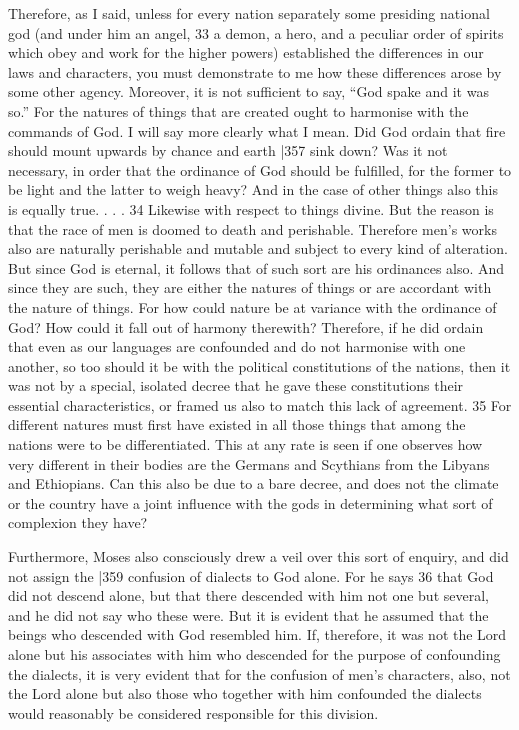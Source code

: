 Therefore, as I said, unless for every nation separately some presiding national god (and under him an angel, 33 a demon, a hero, and a peculiar order of spirits which obey and work for the higher powers) established the differences in our laws and characters, you must demonstrate to me how these differences arose by some other agency. Moreover, it is not sufficient to say, ``God spake and it was so.'' For the natures of things that are created ought to harmonise with the commands of God. I will say more clearly what I mean. Did God ordain that fire should mount upwards by chance and earth
|357 sink down? Was it not necessary, in order that the ordinance of God should be fulfilled, for the former to be light and the latter to weigh heavy? And in the case of other things also this is equally true. . . .
34 Likewise with respect to things divine. But the reason is that the race of men is doomed to death and perishable. Therefore men's works also are naturally perishable and mutable and subject to every kind of alteration. But since God is eternal, it follows that of such sort are his ordinances also. And since they are such, they are either the natures of things or are accordant with the nature of things. For how could nature be at variance with the ordinance of God? How could it fall out of harmony therewith? Therefore, if he did ordain that even as our languages are confounded and do not harmonise with one another, so too should it be with the political constitutions of the nations, then it was not by a special, isolated decree that he gave these
constitutions their essential characteristics, or framed us also to match this lack of agreement. 35 For different natures must first have existed in all those things that among the nations were to be differentiated. This at any rate is seen if one observes how very different in their bodies are the Germans and Scythians from the Libyans and Ethiopians. Can this also be due to a bare decree, and does not the climate or the country have a joint influence with the gods in determining what sort of complexion they have?

Furthermore, Moses also consciously drew a veil over this sort of enquiry, and did not assign the
|359 confusion of dialects to God alone. For he says
36 that God did not descend alone, but that there descended with him not one but several, and he did not say who these were. But it is evident that he assumed that the beings who descended with God resembled him. If, therefore, it was not the Lord alone but his associates with him who descended for the purpose of confounding the dialects, it is very evident that for the confusion of men's characters, also, not the Lord alone but also those who together with him confounded the dialects would reasonably be considered responsible for this division.

